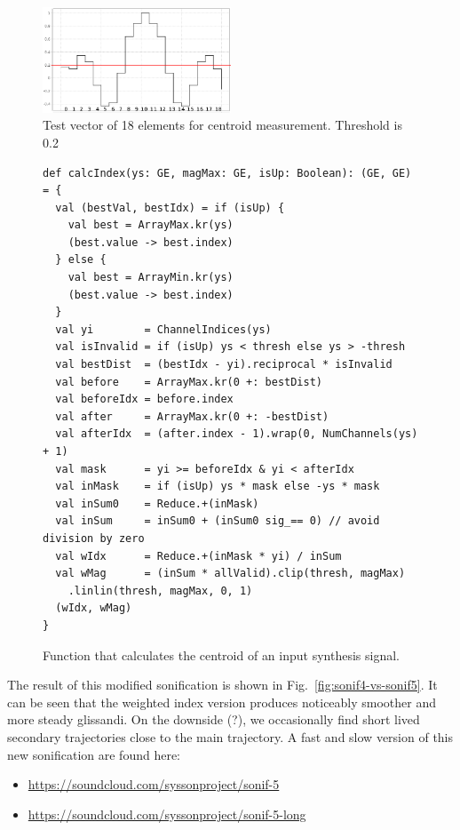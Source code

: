 \documentclass[11pt,a4paper]{article}
\newcommand{\figref}[1]{Fig.~\ref{#1}}
\begin{document}
\begin{figure}
\centering
\includegraphics[width=0.5\textwidth]{figures/centroid-test-plot.png}%
\caption{Test vector of 18 elements for centroid measurement. Threshold is 0.2}
\label{fig:centroid-test-plot}
\end{figure}

\begin{figure}
\begin{lstlisting}[style=scala]
def calcIndex(ys: GE, magMax: GE, isUp: Boolean): (GE, GE) = {
  val (bestVal, bestIdx) = if (isUp) {
    val best = ArrayMax.kr(ys)
    (best.value -> best.index)
  } else {
    val best = ArrayMin.kr(ys)
    (best.value -> best.index)
  }
  val yi        = ChannelIndices(ys)
  val isInvalid = if (isUp) ys < thresh else ys > -thresh
  val bestDist  = (bestIdx - yi).reciprocal * isInvalid
  val before    = ArrayMax.kr(0 +: bestDist)
  val beforeIdx = before.index
  val after     = ArrayMax.kr(0 +: -bestDist)
  val afterIdx  = (after.index - 1).wrap(0, NumChannels(ys) + 1)
  val mask      = yi >= beforeIdx & yi < afterIdx
  val inMask    = if (isUp) ys * mask else -ys * mask
  val inSum0    = Reduce.+(inMask)
  val inSum     = inSum0 + (inSum0 sig_== 0) // avoid division by zero
  val wIdx      = Reduce.+(inMask * yi) / inSum
  val wMag      = (inSum * allValid).clip(thresh, magMax)
    .linlin(thresh, magMax, 0, 1)
  (wIdx, wMag)
}
\end{lstlisting}
\caption{Function that calculates the centroid of an input synthesis signal.}
\label{fig:centroid-synth-function}
\end{figure}

The result of this modified sonification is shown in \figref{fig:sonif4-vs-sonif5}. It can be seen that the weighted index version produces noticeably smoother and more steady glissandi. On the downside (?), we occasionally find short lived secondary trajectories close to the main trajectory. A fast and slow version of this new sonification are found here:
%
\begin{itemize}
\item \url{https://soundcloud.com/syssonproject/sonif-5}
\item \url{https://soundcloud.com/syssonproject/sonif-5-long}
\end{itemize}
\end{document}
